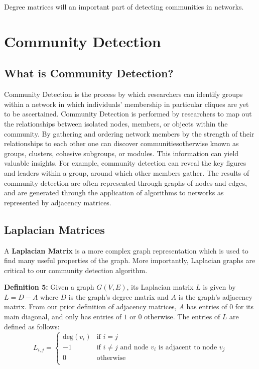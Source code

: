 \documentclass{article}
\begin{document}
\noindent Degree matrices will an important part of detecting communities in networks.

\bigskip 

\section{Community Detection}

\subsection{What is Community Detection?}

Community Detection is the process by which researchers can identify groups within a network in which individuals' membership in particular cliques are yet to be ascertained. 
Community Detection is performed by researchers to map out the relationships between isolated nodes, members, or objects within the community. 
By gathering and ordering network members by the strength of their relationships to each other one can discover communities\textemdash otherwise known as groups, clusters, cohesive subgroups, or modules. 
This information can yield valuable insights. For example, community detection can reveal the key figures and leaders within a group, around which other members gather.
The results of community detection are often represented through graphs of nodes and edges, and are generated through the application of algorithms to networks as represented by adjacency matrices.

\subsection{Laplacian Matrices}

A \textbf{Laplacian Matrix} is a more complex graph representation  which is used to find many useful properties of the graph. More importantly, Laplacian graphs are critical to our community detection algorithm.

\bigskip 

\textbf{Definition 5:} Given a graph $G(V, E)$, its Laplacian matrix $L$ is given by $L = D - A$ where $D$ is the graph's degree matrix and $A$ is the graph's adjacency matrix. From our prior definition of adjacency matrices, $A$ has entries of $0$ for its main diagonal, and only has entries of $1$ or $0$ otherwise. The entries of $L$ are defined as follows:
\[   
L_{i,j} = 
     \begin{cases}
       \text{deg} (v_i) & \text{if } i = j \\
       -1 & \text{if } i \neq j \text{ and} \text{ node } v_i \text{ is adjacent to} \text{ node } v_j\\
       0 & \text{otherwise} \\
     \end{cases}
\]
\end{document}
